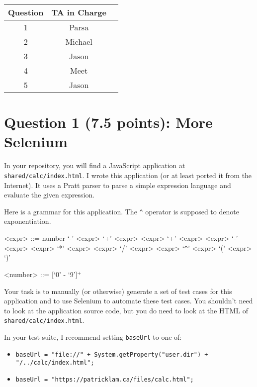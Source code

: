 \documentclass[10pt,hidelinks]{article}
\begin{document}
 \begin{center}
 \begin{tabular}{c|cc}
 Question   &  TA in Charge \\ \hline
1 & Parsa \\
2 & Michael \\
3 & Jason \\
4 & Meet \\
5 & Jason \\
 \end{tabular}
 \end{center}

 \newpage
\section*{Question 1 (7.5 points): More Selenium}

In your repository, you will find a JavaScript application at {\tt
  shared/calc/index.html}. I wrote this application (or at least
ported it from the Internet). It uses a Pratt parser to parse a simple expression language and evaluate the given expression.

Here is a grammar for this application. The \verb+^+ operator is supposed to denote
exponentiation.

\begin{center}
\begin{minipage}{3in}
\begin{grammar}
  <expr> ::= number 
         \alt `-' <expr>
         \alt `+' <expr>
         \alt  <expr> `+' <expr> \alt  <expr> `-' <expr>
         \alt  <expr> `*' <expr> \alt  <expr> `/' <expr>
         \alt  <expr> `\verb+^+' <expr>
         \alt `(' <expr> `)'
         
  <number> ::= [`0' - `9']$^+$
\end{grammar}
\end{minipage}
\end{center}

Your task is to manually (or otherwise) generate a set of test cases
for this application and to use Selenium to automate these test
cases. You shouldn't need to look at the application source
code, but you do need to look at the HTML of {\tt shared/calc/index.html}.

In your test suite, I recommend setting {\tt baseUrl} to one of:
\begin{itemize}
\item \verb!baseUrl = "file://" + System.getProperty("user.dir") + "/../calc/index.html";!
\item \verb!baseUrl = "https://patricklam.ca/files/calc.html";!
\end{itemize}
\end{document}
